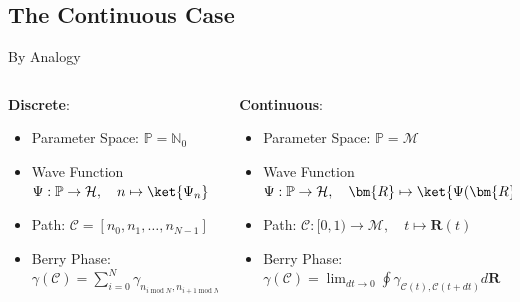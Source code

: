 \documentclass[9pt]{beamer}
\begin{document}
\subsection{The Continuous Case}
\begin{frame}{By Analogy}
  
  \begin{columns}
    \begin{column}{0.5\textwidth}
      
      \textbf{Discrete}:
      \begin{itemize}
        \item<1-> Parameter Space: $\mathbb{P} = \mathbb{N}_{0}$
        \item<2-> Wave Function $\Psi: \mathbb{P} \rightarrow \mathcal{H}, \quad 
              n \mapsto \ket{\Psi_{n}}$
        \item<3-> Path: $\mathcal{C} = [n_{0}, n_{1}, \ldots, n_{N-1}]$
        \item<4-> Berry Phase: $\gamma(\mathcal{C}) = \sum_{i = 0}^{N} \gamma_{n_{i \; 
              \mathrm{mod} \; N}, n_{i+1 \; \mathrm{mod} \; N}}$\\

      \end{itemize}

      \vspace{3ex}
      \colorbox{lightgray}
      {
        \begin{minipage}{\textwidth}
        \end{minipage}
      }
    \end{column}
    \begin{column}{0.5\textwidth}
  
      \textbf{Continuous}:
      \begin{itemize}
        \item<1-> Parameter Space: $\mathbb{P} = \mathcal{M}$
        \item<2-> Wave Function $\Psi: \mathbb{P} \rightarrow \mathcal{H}, \quad \bm{R}
              \mapsto \ket{\Psi(\bm{R})}$
        \item<3-> Path: $\mathcal{C}: [0, 1) \rightarrow \mathcal{M}, \quad t \mapsto 
              \bm{R}(t)$
        \item<4-> Berry Phase: $\gamma(\mathcal{C}) = \lim_{dt \to 0} \oint
              \gamma_{\mathcal{C}(t), \mathcal{C}(t + dt)} d \bm{R}$
      \end{itemize}
      \vspace{3ex}
      \colorbox{lightgray}
      {
        \begin{minipage}{\textwidth}
        \end{minipage}
      }
    \end{column}
  \end{columns}

\end{frame}
\end{document}
